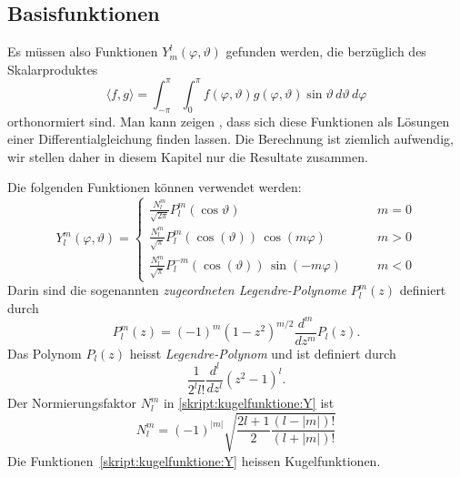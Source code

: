 \subsection{Basisfunktionen}
Es müssen also Funktionen $Y_m^l(\varphi,\vartheta)$ gefunden werden,
die berzüglich des Skalarproduktes
\[
\langle f,g\rangle
=
\int_{-\pi}^{\pi} \int_0^\pi 
f(\varphi,\vartheta) g(\varphi,\vartheta)
\sin\vartheta\,d\vartheta\,d\varphi
\]
orthonormiert sind.
Man kann zeigen \cite{skript:tabea}, dass sich diese Funktionen als Lösungen
einer Differentialgleichung finden lassen.
Die Berechnung ist ziemlich aufwendig, wir stellen daher in diesem
Kapitel nur die Resultate zusammen.

Die folgenden Funktionen können verwendet werden:
\begin{equation}
Y^m_l(\varphi,\vartheta)
=
\begin{cases}
\displaystyle
\frac{N^m_l}{\sqrt{2\pi}} P^m_l(\cos\vartheta)&\qquad m=0
\\[10pt]
\displaystyle
\frac{N^m_l}{\sqrt{\pi}} P^m_l(\cos(\vartheta))\,\cos(m\varphi)&\qquad m>0
\\[10pt]
\displaystyle
\frac{N^m_l}{\sqrt{\pi}} P^{-m}_l(\cos(\vartheta))\,\sin(-m\varphi)&\qquad m<0
\end{cases}
\label{skript:kugelfunktione:Y}
\end{equation}
Darin sind die sogenannten {\em zugeordneten Legendre-Polynome} $P^m_l(z)$
definiert durch
\begin{equation}
P^m_l(z)
=
(-1)^m(1-z^2)^{m/2}\frac{d^m}{dz^m}P_l(z).
\end{equation}
Das Polynom $P_l(z)$ heisst {\em Legendre-Polynom}
 und ist definiert durch
\begin{equation}
\frac{1}{2^ll!}\frac{d^l}{dz^l}(z^2-1)^l.
\end{equation}
Der Normierungsfaktor $N^m_l$ in 
\eqref{skript:kugelfunktione:Y}
ist
\begin{equation}
N^m_l
=
(-1)^{|m|}\sqrt{
\frac{2l+1}{2}\frac{(l-|m|)!}{(l+|m|)!}
}
\end{equation}
Die Funktionen~\eqref{skript:kugelfunktione:Y} heissen Kugelfunktionen.

